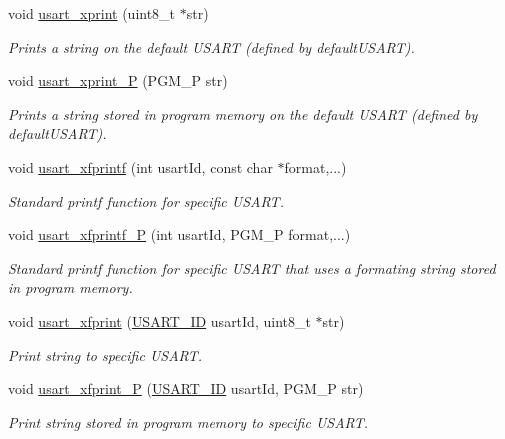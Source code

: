 \begin{DoxyCompactItemize}
void \hyperlink{group__usart_async_module_gab5e44adf779c82fd1c56fb8bca7bffb7}{usart\+\_\+xprint} (uint8\+\_\+t $\ast$str)
\begin{DoxyCompactList}\small\item\em Prints a string on the default U\+S\+A\+RT (defined by default\+U\+S\+A\+RT). \end{DoxyCompactList}\item 
void \hyperlink{group__usart_async_module_ga27ada721bb00993418f8e3ffb1152d52}{usart\+\_\+xprint\+\_\+P} (P\+G\+M\+\_\+P str)
\begin{DoxyCompactList}\small\item\em Prints a string stored in program memory on the default U\+S\+A\+RT (defined by default\+U\+S\+A\+RT). \end{DoxyCompactList}\item 
void \hyperlink{group__usart_async_module_ga94601796b62f88f4364afbc1ed037d10}{usart\+\_\+xfprintf} (int usart\+Id, const char $\ast$format,...)
\begin{DoxyCompactList}\small\item\em Standard printf function for specific U\+S\+A\+RT. \end{DoxyCompactList}\item 
void \hyperlink{group__usart_async_module_ga8092a20ae9bed598702da288b55c80c6}{usart\+\_\+xfprintf\+\_\+P} (int usart\+Id, P\+G\+M\+\_\+P format,...)
\begin{DoxyCompactList}\small\item\em Standard printf function for specific U\+S\+A\+RT that uses a formating string stored in program memory. \end{DoxyCompactList}\item 
void \hyperlink{group__usart_async_module_ga7d6d42b48e50bdd87aecab0dc2a9feb6}{usart\+\_\+xfprint} (\hyperlink{group__usart_async_module_gaae3c5ea77a411e5f40e4377f77067b86}{U\+S\+A\+R\+T\+\_\+\+ID} usart\+Id, uint8\+\_\+t $\ast$str)
\begin{DoxyCompactList}\small\item\em Print string to specific U\+S\+A\+RT. \end{DoxyCompactList}\item 
void \hyperlink{group__usart_async_module_gae8212e8aca5b91172440dc3735dd7ba4}{usart\+\_\+xfprint\+\_\+P} (\hyperlink{group__usart_async_module_gaae3c5ea77a411e5f40e4377f77067b86}{U\+S\+A\+R\+T\+\_\+\+ID} usart\+Id, P\+G\+M\+\_\+P str)
\begin{DoxyCompactList}\small\item\em Print string stored in program memory to specific U\+S\+A\+RT. \end{DoxyCompactList}\item 

\end{DoxyCompactItemize}
